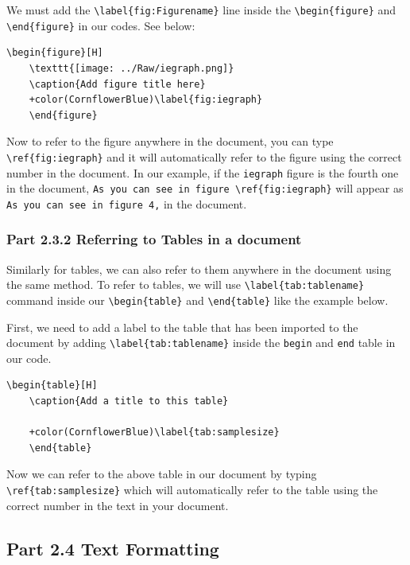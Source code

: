 \documentclass[12pts]{report}
\begin{document}
We must add the \verb|\label{fig:Figurename}| line inside the \verb|\begin{figure}| and \verb|\end{figure}| in our codes. See below:

\begin{Verbatim}[commandchars=+\(\)]
	\begin{figure}[H]
	\texttt{[image: ../Raw/iegraph.png]}
	\caption{Add figure title here}
	+color(CornflowerBlue)\label{fig:iegraph}
	\end{figure}
\end{Verbatim}

Now to refer to the figure anywhere in the document, you can type \verb|\ref{fig:iegraph}| and it will automatically refer to the figure using the correct number in the document. In our example, if the \texttt{iegraph}	figure is the fourth one in the document, \verb|As you can see in figure \ref{fig:iegraph}| will appear as \texttt{As you can see in figure 4,} in the document. 

\subsubsection*{Part 2.3.2 Referring to Tables in a document}

Similarly for tables, we can also refer to them anywhere in the document using the same method. To refer to tables, we will use \verb|\label{tab:tablename}| command inside our \verb|\begin{table}| and \verb|\end{table}| like the example below. 

First, we need to add a label to the table that has been imported to the document by adding \verb|\label{tab:tablename}| inside the \texttt{begin} and \texttt{end} table in our code. 

\begin{Verbatim}[commandchars=+\(\)]
	\begin{table}[H]
	\caption{Add a title to this table}
	
	+color(CornflowerBlue)\label{tab:samplesize}
	\end{table}
\end{Verbatim}

Now we can refer to the above table in our document by typing \verb|\ref{tab:samplesize}| which will automatically refer to the table using the correct number in the text in your document. 

\subsection*{Part 2.4 Text Formatting}
\end{document}
